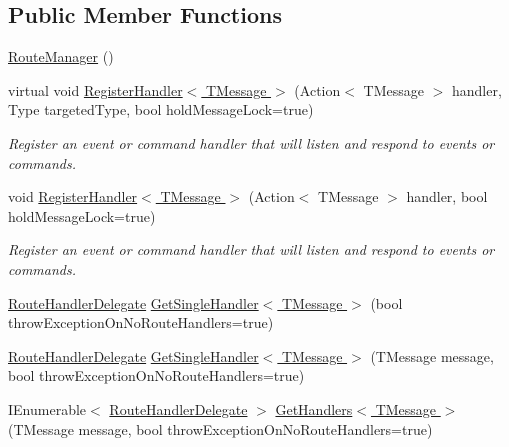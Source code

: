 \subsection*{Public Member Functions}
\begin{DoxyCompactItemize}
\item 
\hyperlink{classCqrs_1_1Bus_1_1RouteManager_abcc8a62319ac7a6edd38ed2d26ef5234}{Route\+Manager} ()
\item 
virtual void \hyperlink{classCqrs_1_1Bus_1_1RouteManager_a5a01e8a6c9ae6311bca2d9e5cb75a7b9}{Register\+Handler$<$ T\+Message $>$} (Action$<$ T\+Message $>$ handler, Type targeted\+Type, bool hold\+Message\+Lock=true)
\begin{DoxyCompactList}\small\item\em Register an event or command handler that will listen and respond to events or commands. \end{DoxyCompactList}\item 
void \hyperlink{classCqrs_1_1Bus_1_1RouteManager_aeb620222dd0351a6d3848caf93e29954}{Register\+Handler$<$ T\+Message $>$} (Action$<$ T\+Message $>$ handler, bool hold\+Message\+Lock=true)
\begin{DoxyCompactList}\small\item\em Register an event or command handler that will listen and respond to events or commands. \end{DoxyCompactList}\item 
\hyperlink{classCqrs_1_1Bus_1_1RouteHandlerDelegate}{Route\+Handler\+Delegate} \hyperlink{classCqrs_1_1Bus_1_1RouteManager_a1fafb5abc81384949c51b1d8887a7921}{Get\+Single\+Handler$<$ T\+Message $>$} (bool throw\+Exception\+On\+No\+Route\+Handlers=true)
\item 
\hyperlink{classCqrs_1_1Bus_1_1RouteHandlerDelegate}{Route\+Handler\+Delegate} \hyperlink{classCqrs_1_1Bus_1_1RouteManager_aa681cc48828440452f6984f198369e69}{Get\+Single\+Handler$<$ T\+Message $>$} (T\+Message message, bool throw\+Exception\+On\+No\+Route\+Handlers=true)
\item 
I\+Enumerable$<$ \hyperlink{classCqrs_1_1Bus_1_1RouteHandlerDelegate}{Route\+Handler\+Delegate} $>$ \hyperlink{classCqrs_1_1Bus_1_1RouteManager_a738be20bb4ad702f7689e2aad70a9dc5}{Get\+Handlers$<$ T\+Message $>$} (T\+Message message, bool throw\+Exception\+On\+No\+Route\+Handlers=true)
\end{DoxyCompactItemize}
